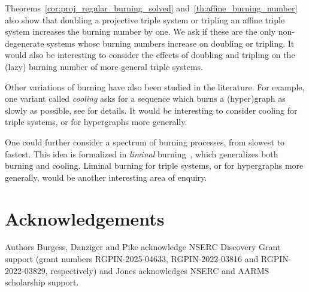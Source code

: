 \documentclass[12pt]{article}
\theoremstyle{definition}
\numberwithin{table}{section}
\begin{document}
Theorems~\ref{cor:proj_regular_burning_solved} and~\ref{th:affine_burning_number} also show that doubling a projective triple system or tripling an affine triple system increases the burning number by one.  We ask if these are the only non-degenerate systems whose burning numbers increase on doubling or tripling.
It would also be interesting to consider the effects of doubling and tripling on the (lazy) burning number of more general triple systems.

Other variations of burning have also been studied in the literature. For example, one variant called {\em cooling} asks for a sequence which burns a (hyper)graph as slowly as possible, see \cite{cooling} for details. 
It would be interesting to consider cooling for triple systems, or for hypergraphs more generally. 

One could further consider a spectrum of burning processes, from slowest to fastest. This idea is formalized in {\em liminal} burning~\cite{liminal}, which generalizes both burning and cooling. 
Liminal burning for triple systems, or for hypergraphs more generally, would be another interesting area of enquiry. 

\section*{Acknowledgements}

Authors Burgess, Danziger and Pike acknowledge NSERC Discovery Grant support (grant numbers RGPIN-2025-04633, RGPIN-2022-03816 and RGPIN-2022-03829, respectively) and Jones acknowledges NSERC and AARMS scholarship support.
\end{document}
